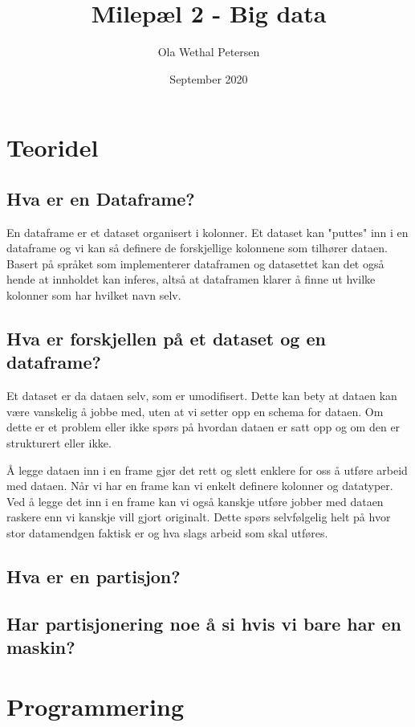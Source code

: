\documentclass{article}
\begin{document}
    \title{Milepæl 2 - Big data}
    \author{Ola Wethal Petersen}
    \date{September 2020}
    \maketitle

    \clearpage 
    \section{Teoridel}
    \subsection*{Hva er en Dataframe?}
    En dataframe er et dataset organisert i kolonner. Et dataset kan "puttes" inn i en dataframe og vi kan så definere de forskjellige kolonnene som tilhører dataen.
    Basert på språket som implementerer dataframen og datasettet kan det også hende at innholdet kan inferes, altså at dataframen klarer å finne ut hvilke kolonner som har hvilket navn selv.
    \subsection*{Hva er forskjellen på et dataset og en dataframe?}
    Et dataset er da dataen selv, som er umodifisert. Dette kan bety at dataen kan være vanskelig å jobbe med, uten at vi setter opp en schema for dataen. Om dette er et problem eller ikke spørs på hvordan dataen er satt opp og om den er strukturert eller ikke. \newline

    \noindent Å legge dataen inn i en frame gjør det rett og slett enklere for oss å utføre arbeid med dataen. Når vi har en frame kan vi enkelt definere kolonner og datatyper. Ved å legge det inn i en frame kan vi også kanskje utføre jobber med dataen raskere enn vi kanskje vill gjort originalt. Dette spørs selvfølgelig helt på hvor stor datamendgen faktisk er og hva slags arbeid som skal utføres.

    \subsection*{Hva er en partisjon?}
    \subsection*{Har partisjonering noe å si hvis vi bare har en maskin?}
    \section{Programmering}
\end{document}
